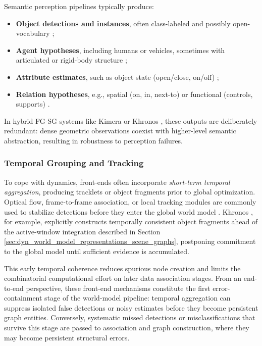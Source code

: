 Semantic perception pipelines typically produce:
\begin{itemize}
    \item \textbf{Object detections and instances}, often class-labeled and possibly open-vocabulary \cite{yan_dynamic_2025} \cite{gu_conceptgraphs_2023};
    \item \textbf{Agent hypotheses}, including humans or vehicles, sometimes with articulated or rigid-body structure \cite{henning_bodyslam_2022} \cite{qiu2022airdos};
    \item \textbf{Attribute estimates}, such as object state (open/close, on/off) \cite{olivastri_multi-modal_2024};
    \item \textbf{Relation hypotheses}, e.g., spatial (on, in, next-to) or functional (controls, supports) \cite{catalano_3d_2025} \cite{zhang_open-vocabulary_2025}.
\end{itemize}

In hybrid FG-SG systems like Kimera \cite{rosinol_kimera_2021} or Khronos \cite{schmid_khronos_2024}, these outputs are deliberately redundant: dense geometric observations coexist with higher-level semantic abstraction, resulting in robustness to perception failures. 

\subsubsection{Temporal Grouping and Tracking}
To cope with dynamics, front-ends often incorporate \textit{short-term temporal aggregation}, producing tracklets or object fragments prior to global optimization. 
Optical flow, frame-to-frame association, or local tracking modules are commonly used to stabilize detections before they enter the global world model \cite{morris_dynosam_2025} \cite{schmid_khronos_2024}.
Khronos \cite{schmid_khronos_2024}, for example, explicitly constructs temporally consistent object fragments ahead of the active-window integration described in Section \ref{sec:dyn_world_model_representations_scene_graphs}, postponing commitment to the global model until sufficient evidence is accumulated.

This early temporal coherence reduces spurious node creation and limits the combinatorial computational effort on later data association stages.
From an end-to-end perspective, these front-end mechanisms constitute the first error-containment stage of the world-model pipeline: temporal aggregation can suppress isolated false detections or noisy estimates before they become persistent graph entities.
Conversely, systematic missed detections or misclassifications that survive this stage are passed to association and graph construction, where they may become persistent structural errors.


